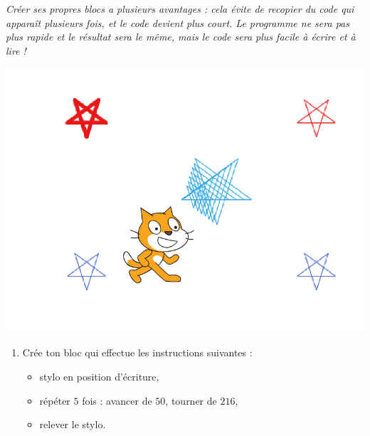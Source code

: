 \documentclass[class=report,crop=false, 12pt]{standalone}
\begin{document}




\bigskip
\bigskip

\emph{Créer ses propres blocs a plusieurs avantages : cela évite de recopier du code qui apparaît plusieurs fois, et le code devient plus court. Le programme ne sera pas plus rapide et le résultat sera le même, mais le code sera plus facile à écrire et à lire !}

\bigskip
\bigskip


\begin{activite}

\sauteligne

\begin{center}
  \includegraphics[scale=\scaleecran]{ecran-11-ex1} 
\end{center}

\begin{enumerate}
  \item Crée ton bloc  qui effectue les instructions suivantes :
    \begin{itemize}
      \item stylo en position d'écriture,
      \item répéter $5$ fois : avancer de $50$, tourner de $216$\textdegree,
      \item relever le stylo.
    \end{itemize}




\end{enumerate}
\end{activite}
\end{document}
